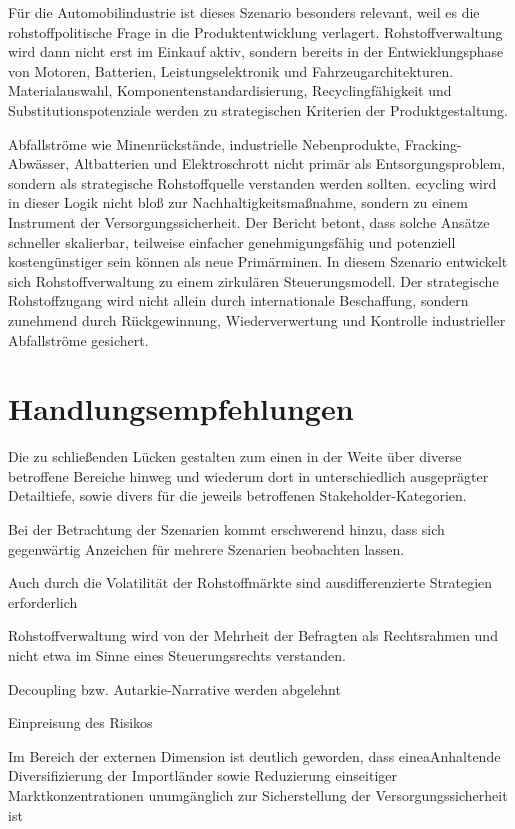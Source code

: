 \documentclass[12pt,a4paper,oneside]{book} %
\begin{document}
Für die Automobilindustrie ist dieses Szenario besonders relevant, weil es die rohstoffpolitische Frage in die Produktentwicklung verlagert. Rohstoffverwaltung wird dann nicht erst im Einkauf aktiv, sondern bereits in der Entwicklungsphase von Motoren, Batterien, Leistungselektronik und Fahrzeugarchitekturen. Materialauswahl, Komponentenstandardisierung, Recyclingfähigkeit und Substitutionspotenziale werden zu strategischen Kriterien der Produktgestaltung.

Abfallströme wie Minenrückstände, industrielle Nebenprodukte, Fracking-Abwässer, Altbatterien und Elektroschrott nicht primär als Entsorgungsproblem, sondern als strategische Rohstoffquelle verstanden werden sollten. ecycling wird in dieser Logik nicht bloß zur Nachhaltigkeitsmaßnahme, sondern zu einem Instrument der Versorgungssicherheit. Der Bericht betont, dass solche Ansätze schneller skalierbar, teilweise einfacher genehmigungsfähig und potenziell kostengünstiger sein können als neue Primärminen. In diesem Szenario entwickelt sich Rohstoffverwaltung zu einem zirkulären Steuerungsmodell. Der strategische Rohstoffzugang wird nicht allein durch internationale Beschaffung, sondern zunehmend durch Rückgewinnung, Wiederverwertung und Kontrolle industrieller Abfallströme gesichert.

\section{Handlungsempfehlungen}

Die zu schließenden Lücken gestalten zum einen in der Weite über diverse betroffene Bereiche hinweg und wiederum dort in unterschiedlich ausgeprägter Detailtiefe, sowie divers für die jeweils betroffenen Stakeholder-Kategorien.

Bei der Betrachtung der Szenarien kommt erschwerend hinzu, dass sich gegenwärtig Anzeichen für mehrere Szenarien beobachten lassen.\autocite{MCbridge, S. 28}

Auch durch die Volatilität der Rohstoffmärkte sind ausdifferenzierte Strategien erforderlich

Rohstoffverwaltung wird von der Mehrheit der Befragten als Rechtsrahmen und nicht etwa im Sinne eines Steuerungsrechts verstanden. 

Decoupling bzw. Autarkie-Narrative werden abgelehnt 

Einpreisung des Risikos

Im Bereich der externen Dimension ist deutlich geworden, dass eineaAnhaltende Diversifizierung der Importländer sowie Reduzierung einseitiger Marktkonzentrationen unumgänglich zur Sicherstellung der Versorgungssicherheit ist
\end{document}
